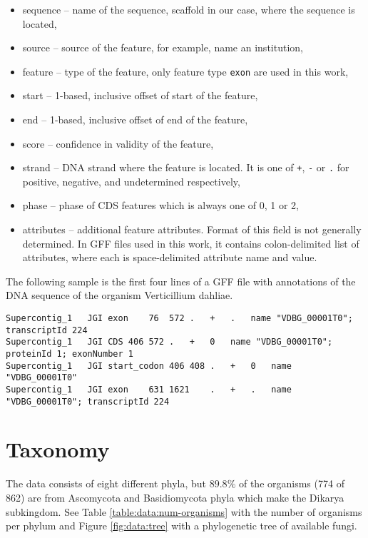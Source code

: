 \begin{itemize}
\item sequence -- name of the sequence, scaffold in our case, where the
  sequence is located,
\item source -- source of the feature, for example, name an institution,
\item feature -- type of the feature, only feature type \Verb_exon_ are used in
  this work,
\item start -- 1-based, inclusive offset of start of the feature,
\item end -- 1-based, inclusive offset of end of the feature,
\item score -- confidence in validity of the feature,
\item strand -- DNA strand where the feature is located. It is one of \Verb_+_,
  \Verb_-_ or \Verb_._ for positive, negative, and undetermined respectively,
\item phase -- phase of CDS features which is always one of 0, 1 or 2,
\item attributes -- additional feature attributes. Format of this field is not
  generally determined. In GFF files used in this work, it contains
  colon-delimited list of attributes, where each is space-delimited attribute
  name and value.
\end{itemize}

The following sample is the first four lines of a GFF file with annotations of
the DNA sequence of the organism Verticillium dahliae.

\begin{Verbatim}[fontsize=\scriptsize]
Supercontig_1   JGI exon    76  572 .   +   .   name "VDBG_00001T0"; transcriptId 224
Supercontig_1   JGI CDS 406 572 .   +   0   name "VDBG_00001T0"; proteinId 1; exonNumber 1
Supercontig_1   JGI start_codon 406 408 .   +   0   name "VDBG_00001T0"
Supercontig_1   JGI exon    631 1621    .   +   .   name "VDBG_00001T0"; transcriptId 224
\end{Verbatim}

\section{\label{ch:data:taxonomy}Taxonomy}

The data consists of eight different phyla, but $89.8\%$ of the organisms (774
of 862) are from Ascomycota and Basidiomycota phyla which make the Dikarya
subkingdom. See Table \ref{table:data:num-organisms} with the number of
organisms per phylum and Figure \ref{fig:data:tree} with a phylogenetic tree of
available fungi.

